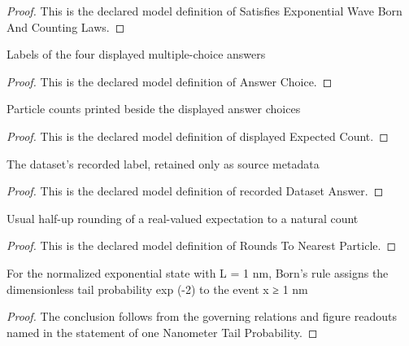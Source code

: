 \begin{proof}
  This is the declared model definition of Satisfies Exponential Wave Born And Counting Laws.
\end{proof}
\begin{definition}
  \label{def:physics:phyx-mini-0638:phyxminiproblems-problemphyxmini0638-answerchoice}
  Labels of the four displayed multiple-choice answers
\end{definition}
\begin{proof}
  This is the declared model definition of Answer Choice.
\end{proof}
\begin{definition}
  \label{def:physics:phyx-mini-0638:phyxminiproblems-problemphyxmini0638-displayedexpectedcount}
  Particle counts printed beside the displayed answer choices
\end{definition}
\begin{proof}
  This is the declared model definition of displayed Expected Count.
\end{proof}
\begin{definition}
  \label{def:physics:phyx-mini-0638:phyxminiproblems-problemphyxmini0638-recordeddatasetanswer}
  The dataset's recorded label, retained only as source metadata
\end{definition}
\begin{proof}
  This is the declared model definition of recorded Dataset Answer.
\end{proof}
\begin{definition}
  \label{def:physics:phyx-mini-0638:phyxminiproblems-problemphyxmini0638-roundstonearestparticle}
  Usual half-up rounding of a real-valued expectation to a natural count
\end{definition}
\begin{proof}
  This is the declared model definition of Rounds To Nearest Particle.
\end{proof}
\begin{lemma}
  \label{lem:physics:phyx-mini-0638:phyxminiproblems-problemphyxmini0638-onenanometertailprobability}
  For the normalized exponential state with L = 1 nm, Born's rule assigns the dimensionless tail probability exp (-2) to the event x ≥ 1 nm
\end{lemma}
\begin{proof}
  The conclusion follows from the governing relations and figure readouts named in the statement of one Nanometer Tail Probability.
\end{proof}
